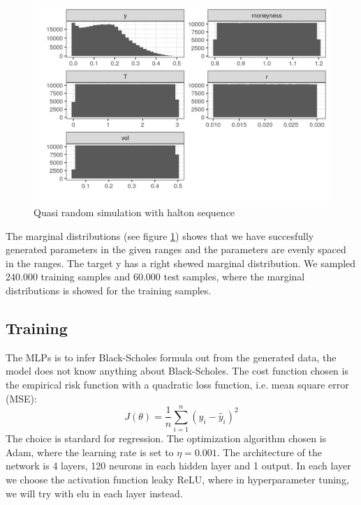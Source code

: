 \begin{figure}[th]
\centering
\includegraphics{Figures/marginalEuroCall.png}
\decoRule
\caption[Marginal distributions for european call]{Quasi random simulation with halton sequence}
\label{fig:marginalEuro}
\end{figure}

The marginal distributions (see figure \ref{fig:marginalEuro}) shows that we have succesfully generated parameters in the given ranges and the parameters are evenly spaced in the ranges. The target y has a right shewed marginal distribution. We sampled 240.000 training samples and 60.000 test samples, where the marginal distributions is showed for the training samples.


\subsection{Training}
The MLPs is to infer Black-Scholes formula out from the generated data, the model does not know anything about Black-Scholes. The cost function chosen is the empirical risk function with a quadratic loss function, i.e. mean square error (MSE):
$$J(\theta)= \frac{1}{n} \sum_{i=1}^{n}(y_i-\hat{y}_i)^2$$
The choice is stardard for regression. The optimization algorithm chosen is Adam, where the learning rate is set to $\eta=0.001$. The architecture of the network is 4 layers, 120 neurons in each hidden layer and 1 output. In each layer we choose the activation function leaky ReLU, where in hyperparameter tuning, we will try with elu in each layer instead.

